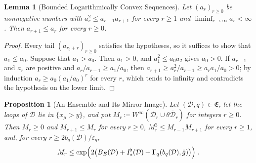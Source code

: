 \documentclass[11pt]{preprint}
\numberwithin{equation}{section}
\newtheorem{proposition}[theorem]{Proposition}
\newtheorem{lemma}[theorem]{Lemma}
\theoremstyle{definition}
\theoremstyle{remark}
\theoremstyle{plain}
\begin{document}
\begin{lemma}[Bounded Logarithmically Convex Sequences]\label{lem:log-convex}
Let $(a_r)_{r \geq 0}$ be nonnegative numbers with $a_r^2 \leq a_{r-1}a_{r+1}$ for every $r \geq 1$ and $\liminf_{r \to \infty}a_r < \infty$. Then $a_{r+1} \leq a_r$ for every $r \geq 0$.
\end{lemma}

\begin{proof}
Every tail $(a_{r_0+r})_{r \geq 0}$ satisfies the hypotheses, so it suffices to show that $a_1 \leq a_0$. Suppose that $a_1 > a_0$. Then $a_1 > 0$, and $a_1^2 \leq a_0a_2$ gives $a_0 > 0$. If $a_{r-1}$ and $a_r$ are positive and $a_r/a_{r-1} \geq a_1/a_0$, then $a_{r+1} \geq a_r^2/a_{r-1} \geq a_ra_1/a_0 > 0$; by induction $a_r \geq a_0(a_1/a_0)^r$ for every $r$, which tends to infinity and contradicts the hypothesis on the lower limit.
\end{proof}

\begin{proposition}[An Ensemble and Its Mirror Image]\label{prop:mirror-pairs}
Let $(\mathcal D, q) \in \mathfrak E$, let the loops of $\mathcal D$ lie in $\{ x_\mu > y \}$, and put $M_r \coloneqq W^\infty(\mathcal D_r \cup \theta\bar{\mathcal D}_r)$ for integers $r \geq 0$. Then $M_r \geq 0$ and $M_{r+1} \leq M_r$ for every $r \geq 0$, $M_r^2 \leq M_{r-1}M_{r+1}$ for every $r \geq 1$, and, for every $r \geq 2b_q(\mathcal D)/\varepsilon_q$,
\begin{equation}\label{eq:mirror-bound}
    M_r \leq \exp\Bigl(2\bigl(B_E(\mathcal D) + I^\flat_*(\mathcal D) + \Gamma_q(b_q(\mathcal D), \bar g)\bigr)\Bigr)\;.
\end{equation}
\end{proposition}
\end{document}
